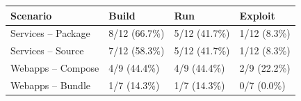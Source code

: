 \begin{tabular*}{\tblwidth}{@{} LLLL@{} }
\toprule
Scenario & Build & Run & Exploit\\
\midrule
Services – Package & 8/12 (66.7\%) & 5/12 (41.7\%) & 1/12 (8.3\%) \\
Services – Source & 7/12 (58.3\%) & 5/12 (41.7\%) & 1/12 (8.3\%) \\
Webapps – Compose & 4/9 (44.4\%) & 4/9 (44.4\%) & 2/9 (22.2\%) \\
Webapps – Bundle & 1/7 (14.3\%) & 1/7 (14.3\%) & 0/7 (0.0\%) \\
\bottomrule
\end{tabular*}